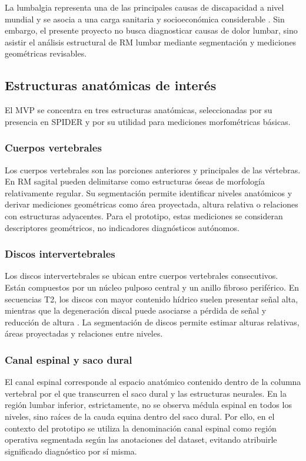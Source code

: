 La lumbalgia representa una de las principales causas de discapacidad a nivel mundial y se asocia a una carga sanitaria y socioeconómica considerable \parencite{hoy_low_back_pain_2014}. Sin embargo, el presente proyecto no busca diagnosticar causas de dolor lumbar, sino asistir el análisis estructural de RM lumbar mediante segmentación y mediciones geométricas revisables.

\subsection{Estructuras anatómicas de interés}

El MVP se concentra en tres estructuras anatómicas, seleccionadas por su presencia en SPIDER y por su utilidad para mediciones morfométricas básicas.

\subsubsection{Cuerpos vertebrales}

Los cuerpos vertebrales son las porciones anteriores y principales de las vértebras. En RM sagital pueden delimitarse como estructuras óseas de morfología relativamente regular. Su segmentación permite identificar niveles anatómicos y derivar mediciones geométricas como área proyectada, altura relativa o relaciones con estructuras adyacentes. Para el prototipo, estas mediciones se consideran descriptores geométricos, no indicadores diagnósticos autónomos.

\subsubsection{Discos intervertebrales}

Los discos intervertebrales se ubican entre cuerpos vertebrales consecutivos. Están compuestos por un núcleo pulposo central y un anillo fibroso periférico. En secuencias T2, los discos con mayor contenido hídrico suelen presentar señal alta, mientras que la degeneración discal puede asociarse a pérdida de señal y reducción de altura \parencite{modic_disk_1988}. La segmentación de discos permite estimar alturas relativas, áreas proyectadas y relaciones entre niveles.

\subsubsection{Canal espinal y saco dural}

El canal espinal corresponde al espacio anatómico contenido dentro de la columna vertebral por el que transcurren el saco dural y las estructuras neurales. En la región lumbar inferior, estrictamente, no se observa médula espinal en todos los niveles, sino raíces de la cauda equina dentro del saco dural. Por ello, en el contexto del prototipo se utiliza la denominación canal espinal como región operativa segmentada según las anotaciones del dataset, evitando atribuirle significado diagnóstico por sí misma.

